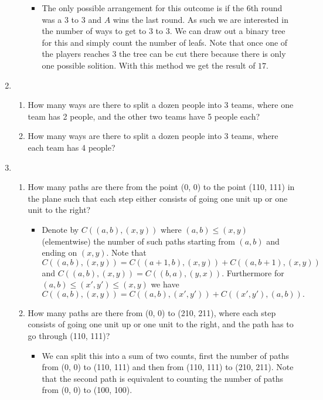 \documentclass{article}
\begin{document}
\begin{enumerate}
\begin{enumerate}
				\begin{itemize}
					\item The only possible arrangement for this outcome is if the $6$th round was a $3$ to $3$ and $A$ wins the last round. As such we are interested in the number of ways to get to $3$ to $3$. We can draw out a binary tree for this and simply count the number of leafs. Note that once one of the players reaches $3$ the tree can be cut there because there is only one possible solition. With this method we get the result of $17$.
				\end{itemize}
		\end{enumerate}
	\item
		\begin{enumerate}
			\item How many ways are there to split a dozen people into 3 teams, where one team has 2 people, and the other two teams have 5 people each?
			\item How many ways are there to split a dozen people into 3 teams, where each team has 4 people?
		\end{enumerate}
	\item
		\begin{enumerate}
			\item How many paths are there from the point (0, 0) to the point (110, 111) in the plane such that each step either consists of going one unit up or one unit to the right?
				\begin{itemize}
					\item Denote by $C((a, b), (x, y))$ where $(a, b) \leq (x, y)$ (elementwise) the number of such paths starting from $(a, b)$ and ending on $(x, y)$. Note that $C((a, b), (x, y)) = C((a + 1, b), (x, y)) + C((a, b + 1), (x, y))$ and $C((a, b), (x, y)) = C((b, a), (y, x))$. Furthermore for $(a, b) \leq (x', y') \leq (x, y)$ we have
					$$
					C((a, b), (x, y)) = C((a, b), (x', y')) + C((x', y'), (a, b)).
					$$
				\end{itemize}
			\item How many paths are there from (0, 0) to (210, 211), where each step consists of going one unit up or one unit to the right, and the path has to go through (110, 111)?
				\begin{itemize}
					\item We can split this into a sum of two counts, first the number of paths from (0, 0) to (110, 111) and then from (110, 111) to (210, 211). Note that the second path is equivalent to counting the number of paths from (0, 0) to (100, 100).
				\end{itemize}
		\end{enumerate}
\end{enumerate}
\end{document}
